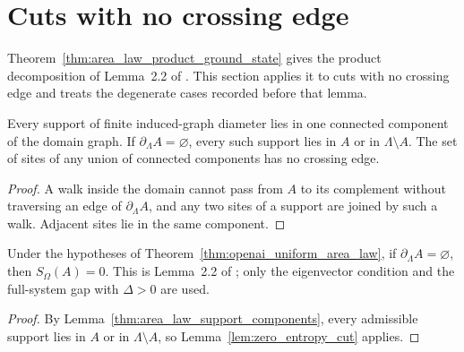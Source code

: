 \section{Cuts with no crossing edge}
\label{sec:area_law_zero_boundary}

Theorem~\ref{thm:area_law_product_ground_state} gives the product decomposition
of Lemma~2.2 of \cite{OpenAI2026AreaLaw}. This section applies it to cuts with
no crossing edge and treats the degenerate cases recorded before that lemma.

\begin{lemma}
    \label{thm:area_law_support_components}
    \leanok
    Every support of finite induced-graph diameter lies in one connected
    component of the domain graph. If $\partial_\Lambda A=\varnothing$, every
    such support lies in $A$ or in $\Lambda\setminus A$. The set of sites of any
    union of connected components has no crossing edge.
\end{lemma}

\begin{proof}\leanok
    A walk inside the domain cannot pass from $A$ to its complement without
    traversing an edge of $\partial_\Lambda A$, and any two sites of a support
    are joined by such a walk. Adjacent sites lie in the same component.
\end{proof}


\begin{lemma}
    \label{thm:area_law_zero_boundary}
    \leanok
    Under the hypotheses of Theorem~\ref{thm:openai_uniform_area_law}, if
    $\partial_\Lambda A=\varnothing$, then $S_\Omega(A)=0$. This is
    Lemma~2.2 of \cite{OpenAI2026AreaLaw}; only the eigenvector condition and the
    full-system gap with $\Delta>0$ are used.
\end{lemma}

\begin{proof}\leanok
    By Lemma~\ref{thm:area_law_support_components}, every admissible support
    lies in $A$ or in $\Lambda\setminus A$, so
    Lemma~\ref{lem:zero_entropy_cut} applies.
\end{proof}

